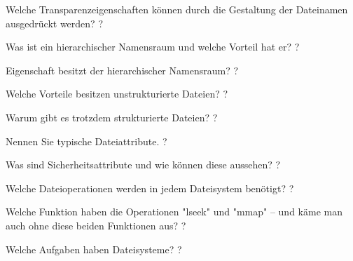 \documentclass[avery5371]{flashcards}
\begin{document}
\begin{flashcard}[Dateisysteme]{Welche Transparenzeigenschaften können durch die Gestaltung der Dateinamen ausgedrückt werden? }
    ?
\end{flashcard}

\begin{flashcard}[Dateisysteme]{Was ist ein hierarchischer Namensraum und welche Vorteil hat er?}
    ?
\end{flashcard}

\begin{flashcard}[Dateisysteme]{Eigenschaft besitzt der hierarchischer Namensraum? }
    ?
\end{flashcard}

\begin{flashcard}[Dateisysteme]{Welche Vorteile besitzen unstrukturierte Dateien? }
    ?
\end{flashcard}

\begin{flashcard}[Dateisysteme]{Warum gibt es trotzdem strukturierte Dateien? }
    ?
\end{flashcard}

\begin{flashcard}[Dateisysteme]{Nennen Sie typische Dateiattribute. }
    ?
\end{flashcard}

\begin{flashcard}[Dateisysteme]{Was sind Sicherheitsattribute und wie können diese aussehen?}
    ?
\end{flashcard}

\begin{flashcard}[Dateisysteme]{Welche Dateioperationen werden in jedem Dateisystem benötigt?}
    ?
\end{flashcard}

\begin{flashcard}[Dateisysteme]{Welche Funktion haben die Operationen "lseek" und "mmap" – und käme man auch ohne diese beiden Funktionen aus?}
    ?
\end{flashcard}

\begin{flashcard}[Dateisysteme]{Welche Aufgaben haben Dateisysteme?}
    ?
\end{flashcard}
\end{document}
